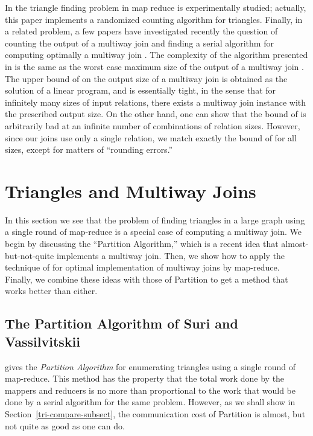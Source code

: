In \cite{PaghT11} the triangle finding problem in map reduce is experimentally studied; actually, this paper implements a randomized counting algorithm for triangles. Finally, in a related problem, a few papers have investigated recently the question of counting the output of a multiway join \cite{AtseriasGM08} and finding a serial algorithm for computing optimally a multiway join \cite{NgoPRR12}. The complexity of the algorithm presented in \cite{NgoPRR12} is the same as the worst case maximum size of the output of a multiway join \cite{AtseriasGM08}. The upper bound of \cite{AtseriasGM08} on the output size of a multiway join is obtained as the solution of a linear program, and is essentially tight, in the sense that for infinitely many sizes of input relations, there exists a multiway join instance with the prescribed output size.
On the other hand, one can show that the bound of \cite{AtseriasGM08} is arbitrarily bad at an infinite number of combinations of relation sizes. However, since our joins use only a single relation, we match exactly the bound of \cite{AtseriasGM08} for all sizes, except for matters of ``rounding errors.''


\section{Triangles and Multiway Joins}
\label{tri-mj-sect}

In this section we see that the problem of finding triangles in a large graph using a single round of map-reduce is a special case of computing a multiway join.  We begin by discussing the ``Partition Algorithm,'' which is a recent idea that almost-but-not-quite implements a multiway join.  Then, we show how to apply the technique of \cite{AU10} for optimal implementation of multiway joins by map-reduce.  Finally, we combine these ideas with those of Partition to get a method that works better than either.

\subsection{The Partition Algorithm of Suri and Vassilvitskii}
\label{partition-subsect}

\cite{SV11} gives the {\em Partition Algorithm} for enumerating triangles using a single round of map-reduce.  This method has the property that the total work done by the mappers and reducers is no more than proportional to the work that would be done by a serial algorithm for the same problem.  However, as we shall show in Section~\ref{tri-compare-subsect}, the communication cost of Partition is almost, but not quite as good as one can do.

